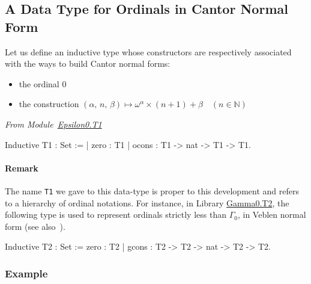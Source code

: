 \subsection{A Data Type for  Ordinals in Cantor Normal Form}
\label{sec:orgheadline72}
\label{sec:T1-inductive-def}





    Let us define an inductive type whose 
constructors are respectively associated
with the ways to build Cantor normal forms:

\begin{itemize}
\item the ordinal \(0\)
\item the construction \((\alpha,\, n,\,\beta)  \mapsto \omega^\alpha \times (n + 1)+ \beta \quad (n\in\mathbb{N})\)
\end{itemize}


\vspace{4pt}
\noindent\emph{From Module~\href{../theories/html/hydras.Epsilon0.T1.html\#T1}{Epsilon0.T1}}

\label{types:T1}

\begin{Coqsrc}
Inductive T1 : Set  :=
| zero : T1
| ocons : T1 -> nat -> T1 -> T1.
\end{Coqsrc}



\paragraph{Remark}
The name \texttt{T1} we gave to this data-type  is proper to this development and refers
to a hierarchy of ordinal notations. For instance, in Library \href{../theories/html/hydras.Gamma0.T2.html}{Gamma0.T2},  the following type is used to represent ordinals strictly less than \(\Gamma_0\),  in Veblen normal form (see also~\cite{schutte}).
\noindent
\begin{Coqsrc}
Inductive T2 : Set :=
  zero : T2
| gcons : T2 -> T2 -> nat -> T2 -> T2.
\end{Coqsrc}

\subsubsection{Example}

